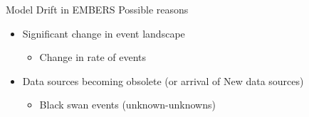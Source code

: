 \begin{frame}{Model Drift in EMBERS}
Possible reasons
\begin{itemize}
    \item<1->Significant change in event landscape
    \begin{itemize}
        \item<2-> Change in rate of events 
    \end{itemize}
    \item<3-> Data sources becoming obsolete (or arrival of New data sources)
        \begin{itemize}
            \item Black swan events (unknown-unknowns)
        \end{itemize}
\end{itemize}
\end{frame}


